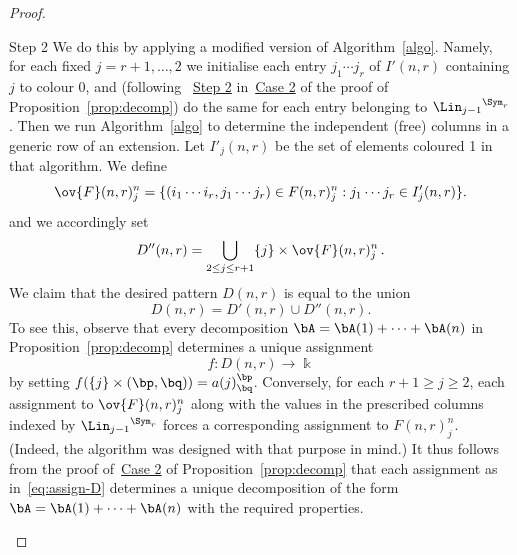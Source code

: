 \begin{proof}
\begin{enonce*}[remark]{\hypertarget{prop6.13_S1}{Step 2}}
We do this by applying a modified version of Algorithm~\ref{algo}. Namely, for each fixed $j = r+1, \dots, 2$ we initialise
each entry $j_1 \cdots j_r$ of $I'(n,r)$ containing $j$ to colour 0,
and (following ~\hyperlink{Step 2}{Step 2} in~\hyperlink{Case 2}{Case 2} of the proof of Proposition~\ref{prop:decomp}) do the same for each entry belonging to
${\Lin_{j-1}}^{\Sym_r}$. Then we run Algorithm~\ref{algo} to determine
the independent (free) columns in a generic row of an extension. Let
$I'_j(n,r)$ be the set of elements coloured 1 in that algorithm. We
define
\[
\ov{F}(n,r)^n_j = \{(i_1\cdots i_r, j_1\cdots j_r) \in F(n,r)^n_j :
j_1\cdots j_r \in I'_j(n,r)\}.
\]
and we accordingly set
\[
D''(n,r) = \bigcup_{2\leq j \leq r+1} \{j\}\times
 \ov{F}(n,r)^n_j \, .
\]
We claim that the desired pattern $D(n,r)$ is equal to the union
\[
D(n,r) = D'(n,r) \cup D''(n,r).
\]
To see this, observe that every decomposition $\bA = \bA(1) +\cdots+
\bA(n)$ in Proposition~\ref{prop:decomp} determines a unique
assignment
\begin{equation}\label{eq:assign-D}
f: D(n,r) \to \Bbbk
\end{equation}
by setting $f(\{j\} \times (\bp,\bq)) = a(j)^\bp_\bq$. Conversely,
for each $r+1 \ge j \ge 2$, each assignment to $\ov{F}(n,r)^n_j$ along
with the values in the prescribed columns indexed by
${\Lin_{j-1}}^{\Sym_r}$ forces a corresponding assignment to
$F(n,r)^n_j$. (Indeed, the algorithm was designed with that purpose in
mind.) It thus follows from the proof of~\hyperlink{Case 2}{Case 2} of Proposition~\ref{prop:decomp} that each assignment as in~\eqref{eq:assign-D}
determines a unique decomposition of the form $\bA = \bA(1) +\cdots+
\bA(n)$ with the required properties.\qedhere
\end{enonce*}
\end{proof}

